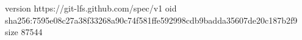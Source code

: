 version https://git-lfs.github.com/spec/v1
oid sha256:7595e08c27a38f33268a90c74f581ffe592998cdb9badda35607de20c187b2f9
size 87544
